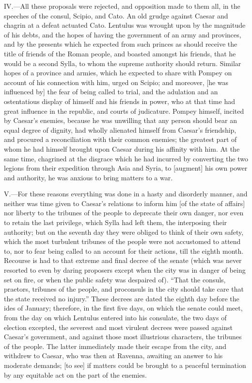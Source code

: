 IV.—All these proposals were rejected, and opposition made to them all,
in the speeches of the consul, Scipio, and Cato. An old grudge against
Caesar and chagrin at a defeat actuated Cato. Lentulus was wrought upon
by the magnitude of his debts, and the hopes of having the government of
an army and provinces, and by the presents which he expected from such
princes as should receive the title of friends of the Roman people, and
boasted amongst his friends, that he would be a second Sylla, to whom
the supreme authority should return. Similar hopes of a province and
armies, which he expected to share with Pompey on account of his
connection with him, urged on Scipio; and moreover, [he was influenced
by] the fear of being called to trial, and the adulation and an
ostentatious display of himself and his friends in power, who at that
time had great influence in the republic, and courts of judicature.
Pompey himself, incited by Caesar's enemies, because he was unwilling
that any person should bear an equal degree of dignity, had wholly
alienated himself from Caesar's friendship, and procured a
reconciliation with their common enemies; the greatest part of whom he
had himself brought upon Caesar during his affinity with him. At the
same time, chagrined at the disgrace which he had incurred by converting
the two legions from their expedition through Asia and Syria, to
[augment] his own power and authority, he was anxious to bring matters
to a war.

V.—For these reasons everything was done in a hasty and disorderly
manner, and neither was time given to Caesar's relations to inform him
[of the state of affairs] nor liberty to the tribunes of the people to
deprecate their own danger, nor even to retain the last privilege, which
Sylla had left them, the interposing their authority; but on the seventh
day they were obliged to think of their own safety, which the most
turbulent tribunes of the people were not accustomed to attend to, nor
to fear being called to an account for their actions, till the eighth
month. Recourse is had to that extreme and final decree of the senate
(which was never resorted to even by daring proposers except when the
city was in danger of being set on fire, or when the public safety was
despaired of). ``That the consuls, praetors, tribunes of the people, and
proconsuls in the city should take care that the state received no
injury.'' These decrees are dated the eighth day before the ides of
January; therefore, in the first five days, on which the senate could
meet, from the day on which Lentulus entered into his consulate, the two
days of election excepted, the severest and most virulent decrees were
passed against Caesar's government, and against those most illustrious
characters, the tribunes of the people. The latter immediately made
their escape from the city, and withdrew to Caesar, who was then at
Ravenna, awaiting an answer to his moderate demands; [to see] if matters
could be brought to a peaceful termination by any equitable act on the
part of the enemies.

